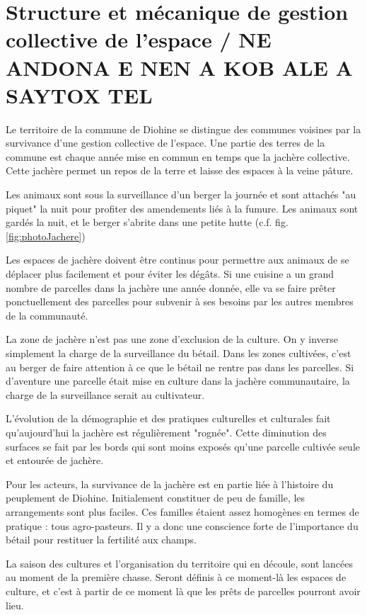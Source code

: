 \section{Structure et mécanique de gestion collective de l'espace / NE ANDONA E NEN A KOB ALE A SAYTOX TEL}

\begin{paracol}{2}
  Le territoire de la commune de Diohine se distingue des communes voisines par la survivance d'une gestion collective de l'espace. Une partie des terres de la commune est chaque année mise en commun en temps que la jachère collective. Cette jachère permet un repos de la terre et laisse des espaces à la veine pâture.

  Les animaux sont sous la surveillance d'un berger la journée et sont attachés "au piquet" la nuit pour profiter des amendements liés à la fumure. Les animaux sont gardés la nuit, et le berger s'abrite dans une petite hutte (c.f. fig. \ref{fig:photoJachere})

  Les espaces de jachère doivent être continus pour permettre aux animaux de se déplacer plus facilement et pour éviter les dégâts. Si une cuisine a un grand nombre de parcelles dans la jachère une année donnée, elle va se faire prêter ponctuellement des parcelles pour subvenir à ses besoins par les autres membres de la communauté.

  La zone de jachère n'est pas une zone d'exclusion de la culture. On y inverse simplement la charge de la surveillance du bétail. Dans les zones cultivées, c'est au berger de faire attention à ce que le bétail ne rentre pas dans les parcelles. Si d'aventure une parcelle était mise en culture dans la jachère communautaire, la charge de la surveillance serait au cultivateur.

  L'évolution de la démographie et des pratiques culturelles et culturales fait qu'aujourd'hui la jachère est régulièrement "rognée". Cette diminution des surfaces se fait par les bords qui sont moins exposés qu'une parcelle cultivée seule et entourée de jachère.

  Pour les acteurs, la survivance de la jachère est en partie liée à l'histoire du peuplement de Diohine. Initialement constituer de peu de famille, les arrangements sont plus faciles. Ces familles étaient assez homogènes en termes de pratique : tous agro-pasteurs. Il y a donc une conscience forte de l'importance du bétail pour restituer la fertilité aux champs.

  La saison des cultures et l'organisation du territoire qui en découle, sont lancées au moment de la première chasse. Seront définis à ce moment-là les espaces de culture, et c'est à partir de ce moment là que les prêts de parcelles pourront avoir lieu.


\end{paracol}
